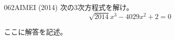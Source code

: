 \begin{prob}{062}{}{AIMEI (2014)}
 次の3次方程式を解け。\\
 \[ \sqrt{2014}x^3-4029x^2+2=0 \]
\end{prob}
ここに解答を記述。